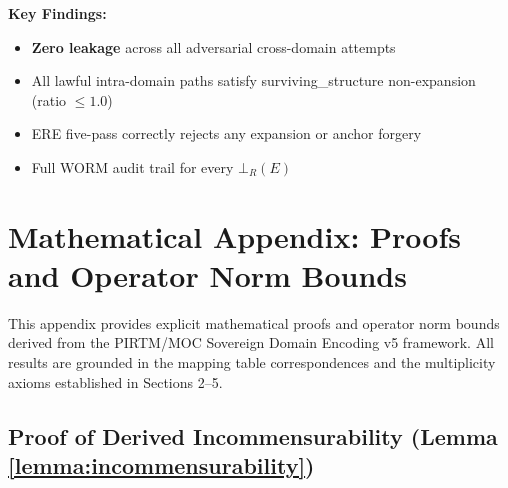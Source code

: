 \documentclass[11pt,a4paper]{article}
\begin{document}
\textbf{Key Findings:}
\begin{itemize}
    \item \textbf{Zero leakage} across all adversarial cross-domain attempts
    \item All lawful intra-domain paths satisfy surviving\_structure non-expansion (ratio $\leq 1.0$)
    \item ERE five-pass correctly rejects any expansion or anchor forgery
    \item Full WORM audit trail for every $\bot_R(E)$
\end{itemize}

\appendix
\section{Mathematical Appendix: Proofs and Operator Norm Bounds}

This appendix provides explicit mathematical proofs and operator norm bounds derived from the PIRTM/MOC Sovereign Domain Encoding v5 framework. All results are grounded in the mapping table correspondences and the multiplicity axioms established in Sections 2--5.

\subsection{Proof of Derived Incommensurability (Lemma \ref{lemma:incommensurability})}
\end{document}
